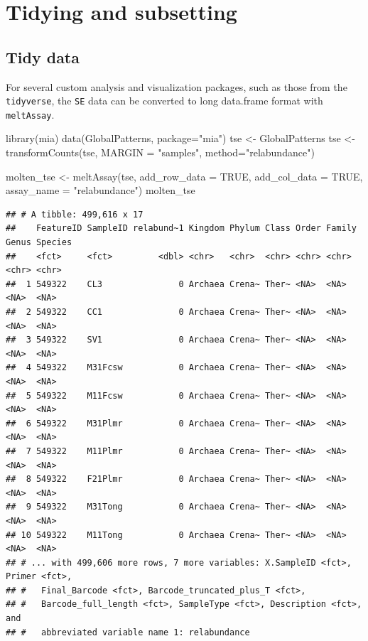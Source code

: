 \documentclass[
]{book}
\newenvironment{Shaded}{\begin{snugshade}}{\end{snugshade}}
\newcommand{\AttributeTok}[1]{\textcolor[rgb]{0.77,0.63,0.00}{#1}}
\newcommand{\ConstantTok}[1]{\textcolor[rgb]{0.00,0.00,0.00}{#1}}
\newcommand{\FunctionTok}[1]{\textcolor[rgb]{0.00,0.00,0.00}{#1}}
\newcommand{\NormalTok}[1]{#1}
\newcommand{\OtherTok}[1]{\textcolor[rgb]{0.56,0.35,0.01}{#1}}
\newcommand{\StringTok}[1]{\textcolor[rgb]{0.31,0.60,0.02}{#1}}
\begin{document}
\hypertarget{tidying-and-subsetting}{%
\section{Tidying and subsetting}\label{tidying-and-subsetting}}

\hypertarget{tidy-data}{%
\subsection{Tidy data}\label{tidy-data}}

For several custom analysis and visualization packages, such as those from the
\texttt{tidyverse}, the \texttt{SE} data can be converted to long data.frame format with
\texttt{meltAssay}.

\begin{Shaded}
\begin{Highlighting}[]
\FunctionTok{library}\NormalTok{(mia)}
\FunctionTok{data}\NormalTok{(GlobalPatterns, }\AttributeTok{package=}\StringTok{"mia"}\NormalTok{)}
\NormalTok{tse }\OtherTok{\textless{}{-}}\NormalTok{ GlobalPatterns}
\NormalTok{tse }\OtherTok{\textless{}{-}} \FunctionTok{transformCounts}\NormalTok{(tse, }\AttributeTok{MARGIN =} \StringTok{"samples"}\NormalTok{, }\AttributeTok{method=}\StringTok{"relabundance"}\NormalTok{)}

\NormalTok{molten\_tse }\OtherTok{\textless{}{-}} \FunctionTok{meltAssay}\NormalTok{(tse,}
                        \AttributeTok{add\_row\_data =} \ConstantTok{TRUE}\NormalTok{,}
                        \AttributeTok{add\_col\_data =} \ConstantTok{TRUE}\NormalTok{,}
                        \AttributeTok{assay\_name =} \StringTok{"relabundance"}\NormalTok{)}
\NormalTok{molten\_tse}
\end{Highlighting}
\end{Shaded}

\begin{verbatim}
## # A tibble: 499,616 x 17
##    FeatureID SampleID relabund~1 Kingdom Phylum Class Order Family Genus Species
##    <fct>     <fct>         <dbl> <chr>   <chr>  <chr> <chr> <chr>  <chr> <chr>  
##  1 549322    CL3               0 Archaea Crena~ Ther~ <NA>  <NA>   <NA>  <NA>   
##  2 549322    CC1               0 Archaea Crena~ Ther~ <NA>  <NA>   <NA>  <NA>   
##  3 549322    SV1               0 Archaea Crena~ Ther~ <NA>  <NA>   <NA>  <NA>   
##  4 549322    M31Fcsw           0 Archaea Crena~ Ther~ <NA>  <NA>   <NA>  <NA>   
##  5 549322    M11Fcsw           0 Archaea Crena~ Ther~ <NA>  <NA>   <NA>  <NA>   
##  6 549322    M31Plmr           0 Archaea Crena~ Ther~ <NA>  <NA>   <NA>  <NA>   
##  7 549322    M11Plmr           0 Archaea Crena~ Ther~ <NA>  <NA>   <NA>  <NA>   
##  8 549322    F21Plmr           0 Archaea Crena~ Ther~ <NA>  <NA>   <NA>  <NA>   
##  9 549322    M31Tong           0 Archaea Crena~ Ther~ <NA>  <NA>   <NA>  <NA>   
## 10 549322    M11Tong           0 Archaea Crena~ Ther~ <NA>  <NA>   <NA>  <NA>   
## # ... with 499,606 more rows, 7 more variables: X.SampleID <fct>, Primer <fct>,
## #   Final_Barcode <fct>, Barcode_truncated_plus_T <fct>,
## #   Barcode_full_length <fct>, SampleType <fct>, Description <fct>, and
## #   abbreviated variable name 1: relabundance
\end{verbatim}
\end{document}
